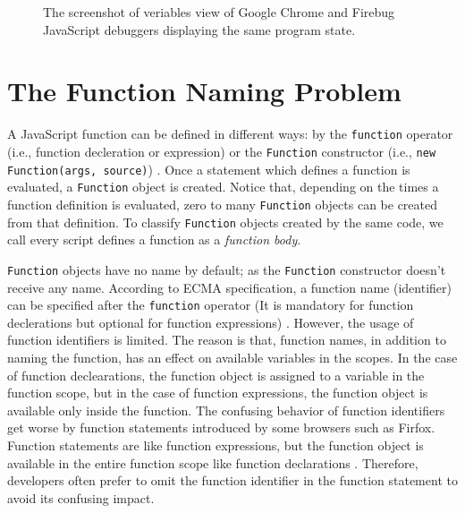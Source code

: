 \documentclass{acm_proc_article-sp}
\begin{document}
\begin{figure}[htp]
\centerline{
\hfil
{}}
\caption{The screenshot of veriables view of Google Chrome and Firebug JavaScript debuggers displaying the same program state.}
\label{debuggers-objects}
\end{figure}


\section{The Function Naming Problem}

A JavaScript function can be defined in different ways: by the {\small\texttt{function}} operator (i.e., function decleration or expression) or the {\small\texttt{Function}} constructor (i.e., {\small\texttt{new Function(args, source)}}) \cite{ECMA}. Once a statement which defines a function is evaluated, a {\small\texttt{Function}} object is created. Notice that, depending on the times a function definition is evaluated, zero to many {\small\texttt{Function}} objects can be created from that definition. To classify {\small\texttt{Function}} objects created by the same code, we call every script defines a function as a \textit{function body}. 

{\small\texttt{Function}} objects have no name by default; as the {\small\texttt{Function}} constructor doesn't receive any name. According to ECMA specification, a function name (identifier) can be specified after the {\small\texttt{function}} operator (It is mandatory for function declerations but optional for function expressions) \cite{ECMA}. However, the usage of function identifiers is limited. The reason is that, function names, in addition to naming the function, has an effect on available variables in the scopes. In the case of function declearations, the function object is assigned to a variable in the function scope, but in the case of function expressions, the function object is available only inside the function. The confusing behavior of function identifiers get worse by function statements introduced by some browsers such as Firfox. Function statements are like function expressions, but the function object is available in the entire function scope like function declarations \cite{Zaytsev}. Therefore, developers often prefer to omit the function identifier in the function statement to avoid its confusing impact.
\end{document}
